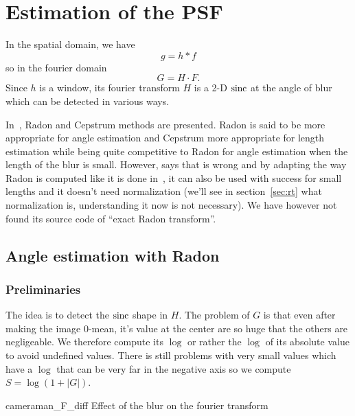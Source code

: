 \section{Estimation of the PSF}
In the spatial domain, we have
\[ g = h * f \]
so in the fourier domain
\[ G = H \cdot F. \]
Since $h$ is a window,
its fourier transform $H$ is
a 2-D $\operatorname{sinc}$ at the angle of blur
which can be detected in various ways.

In~\cite{krahmer2006blind},
Radon and Cepstrum methods are presented.
Radon is said to be more appropriate for angle
estimation and Cepstrum more appropriate for length
estimation while being quite competitive to Radon
for angle estimation when the length of the blur
is small.
However, \cite{oliveira2007blind} says that
\cite{krahmer2006blind} is wrong and by adapting
the way Radon is computed like it is done
in~\cite{oliveira2006implementation},
it can also be used with success for small lengths and
it doesn't need normalization
(we'll see in section~\ref{sec:rt} what
normalization is,
understanding it now is not necessary).
We have however not found its source code of
``exact Radon transform''.

\subsection{Angle estimation with Radon}
\label{subsec:Radon}
\subsubsection{Preliminaries}
The idea is to detect the $\operatorname{sinc}$ shape in $H$.
The problem of $G$ is that even
after making the image 0-mean,
it's value at the center are so huge that the others
are negligeable.
We therefore compute its $\log$ or rather the $\log$
of its absolute value to avoid undefined values.
There is still problems with very small values which
have a $\log$ that can be very far in the negative axis
so we compute $S = \log(1 + |G|)$.

\begin{myfig}{cameraman_F_diff}
  {Effect of the blur on the fourier transform}
\end{myfig}

